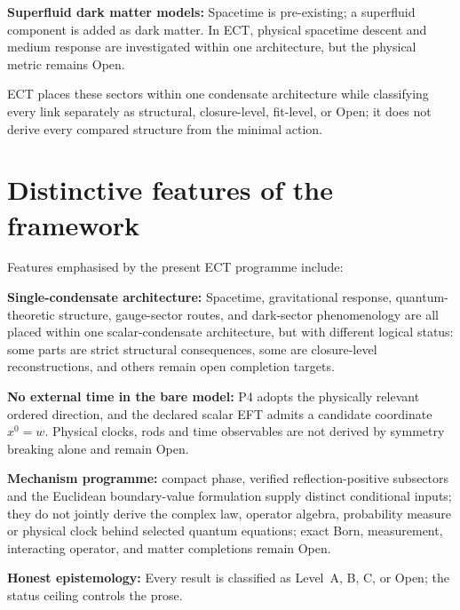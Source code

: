 \documentclass[11pt,a4paper]{article}
\begin{document}
\textbf{Superfluid dark matter models:} Spacetime is pre-existing; a
superfluid component is added as dark matter.  In ECT, physical spacetime
descent and medium response are investigated within one architecture, but
the physical metric remains Open.

ECT places these sectors within one condensate architecture while classifying every link separately as structural, closure-level, fit-level, or Open; it does not derive every compared structure from the minimal action.


\section{Distinctive features of the framework}

Features emphasised by the present ECT programme include:

\textbf{Single-condensate architecture:} Spacetime, gravitational response, quantum-theoretic structure, gauge-sector routes, and dark-sector phenomenology are all placed within one scalar-condensate architecture, but with different logical status: some parts are strict structural consequences, some are closure-level reconstructions, and others remain open completion targets.

\textbf{No external time in the bare model:} P4 adopts the physically relevant ordered direction, and the declared scalar EFT admits a candidate coordinate $x^0=w$.  Physical clocks, rods and time observables are not derived by symmetry breaking alone and remain Open.

\textbf{Mechanism programme:} compact phase, verified reflection-positive subsectors and the Euclidean boundary-value formulation supply distinct conditional inputs; they do not jointly derive the complex law, operator algebra, probability measure or physical clock behind selected quantum equations; exact Born, measurement, interacting operator, and matter completions remain Open.

\textbf{Honest epistemology:} Every result is classified as Level~A, B, C, or Open; the status ceiling controls the prose.
\end{document}
